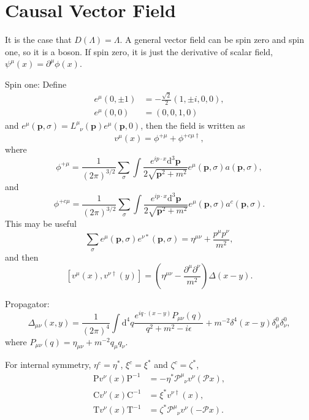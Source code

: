 \documentclass[9pt]{extbook}
\begin{document}
\section{Causal Vector Field}
It is the case that $D(\Lambda)=\Lambda$. A general vector field can be spin zero and spin one, so it is a boson. If spin zero, it is just the derivative of scalar field, $\psi^\mu(x)=\partial^\mu \phi(x)$.

Spin one: Define
\[
\begin{split}
	e^\mu(0,\pm 1)&=-\frac{\sqrt{2}}{2}(1,\pm i,0,0),\\
	e^\mu(0,0)&=(0,0,1,0)
\end{split}
\]
and $e^\mu(\bm{p},\sigma)=L^\mu_{\phantom{\mu}\nu}(\bm{p})e^\mu(\bm{p},0)$, then the field is written as 
\[
	v^\mu(x)=\phi^{+\mu}+\phi^{+c\mu\dag},
\]
where
\[
	\phi^{+\mu}=\frac{1}{(2\pi)^{3/2}}\sum_{\sigma}\int \frac{e^{ip\cdot x}\mathrm{d}^3\bm{p}}{2\sqrt{\bm{p}^2+m^2}}e^\mu(\bm{p},\sigma)a(\bm{p},\sigma),
\]
and
\[
	\phi^{+c\mu}=\frac{1}{(2\pi)^{3/2}}\sum_{\sigma}\int \frac{e^{ip\cdot x}\mathrm{d}^3\bm{p}}{2\sqrt{\bm{p}^2+m^2}}e^\mu(\bm{p},\sigma)a^c(\bm{p},\sigma).
\]
This may be useful
\[
	\sum_{\sigma} e^\mu(\bm{p},\sigma)e^{\nu*}(\bm{p},\sigma)=\eta^{\mu\nu}+\frac{p^\mu p^\nu}{m^2},
\]
and then
\[
	[v^\mu(x),v^{\nu\dag}(y)]=\left(\eta^{\mu\nu}-\frac{\partial^\mu \partial^\nu}{m^2}\right)\Delta(x-y).
\]

Propagator:
\[
	\Delta_{\mu\nu}(x,y)=\frac{1}{(2\pi)^4}\int \mathrm{d}^4q \frac{e^{iq\cdot (x-y)}P_{\mu\nu}(q)}{q^2+m^2-i\epsilon}+m^{-2}\delta^4(x-y)\delta^0_\mu \delta^0_\nu,
\]
where $P_{\mu\nu}(q)=\eta_{\mu\nu}+m^{-2}q_\mu q_\nu$.

For internal symmetry, $\eta^c=\eta^*$, $\xi^c=\xi^*$ and $\zeta^c=\zeta^*$,
\[
\begin{split}
	\mathrm{P}v^\nu(x)\mathrm{P}^{-1}&=-\eta^*\mathscr{P}^\mu_{\phantom{\mu}\nu}v^\nu(\mathscr{P}x),\\
	\mathrm{C}v^\nu(x)\mathrm{C}^{-1}&=\xi^*v^{\nu\dag}(x),\\
	\mathrm{T}v^\nu(x)\mathrm{T}^{-1}&=\zeta^*\mathscr{P}^\mu_{\phantom{\mu}\nu}v^\nu(-\mathscr{P}x).
\end{split}
\]
\end{document}
